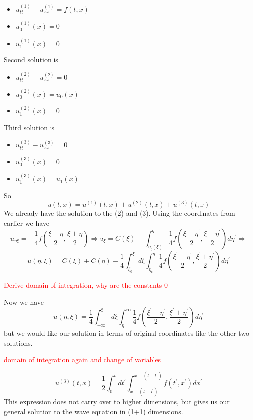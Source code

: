 \documentclass[11pt,a4paper]{article}
\begin{document}
\begin{itemize}
	\item $u^{(1)}_{tt}-u^{(1)}_{xx} = f(t,x)$
	\item $u^{(1)}_{0}(x) = 0$
	\item$ u^{(1)}_{1}(x) = 0$
\end{itemize}
Second solution is
\begin{itemize}
	\item $u^{(2)}_{tt}-u^{(2)}_{xx} = 0$
	\item $u^{(2)}_{0}(x) = u_{0}(x)$
	\item$ u^{(2)}_{1}(x) = 0$
\end{itemize}
Third solution is
\begin{itemize}
	\item $u^{(3)}_{tt}-u^{(3)}_{xx} = 0$
	\item $u^{(3)}_{0}(x) = 0$
	\item$ u^{(3)}_{1}(x) = u_{1}(x)$
\end{itemize}
So
$$
u(t,x) = u^{(1)}(t,x) + u^{(2)}(t,x) + u^{(3)}(t,x)
$$
We already have the solution to the (2) and (3). Using the coordinates from earlier we have
$$
u_{\eta\xi} = -\frac{1}{4}f(\frac{\xi - \eta}{2},\frac{\xi + \eta}{2}) \Rightarrow u_{\xi} = C(\xi) - \int_{\eta_{0}(\xi)}^{\eta}\frac{1}{4}f(\frac{\xi - \eta^{\prime}}{2},\frac{\xi + \eta^{\prime}}{2})d\eta^{\prime}\Rightarrow
$$
$$
u(\eta,\xi) = C(\xi)+C(\eta) - \frac{1}{4}\int_{\xi_{0}}^{\xi}d\xi\int_{\eta_{0}}^{\eta}\frac{1}{4}f(\frac{\xi^{\prime} - \eta^{\prime}}{2},\frac{\xi^{\prime} + \eta^{\prime}}{2})d\eta^{\prime}
$$
\begin{center}
\textcolor{red}{Derive domain of integration, why are the constants 0}
\end{center}
Now we have
$$
u(\eta,\xi)=   \frac{1}{4}\int_{-\infty}^{\xi}d\xi\int_{\eta}^{\infty}\frac{1}{4}f(\frac{\xi^{\prime} - \eta^{\prime}}{2},\frac{\xi^{\prime} + \eta^{\prime}}{2})d\eta^{\prime}
$$
but we would like our solution in terms of original coordinates like the other two solutions.
\begin{center} \textcolor{red}{domain of integration again and change of variables}
\end{center}
$$
u^{(3)}(t,x) = \frac{1}{2}\int_{0}^{t}dt^{\prime}\int_{x-(t-t^{\prime})}^{x+(t-t^{\prime})}f(t^{\prime},x^{\prime})dx^{\prime}
$$
This expression does not carry over to higher dimensions, but gives us our general solution to the wave equation in (1+1) dimensions. 
\newline
\end{document}
